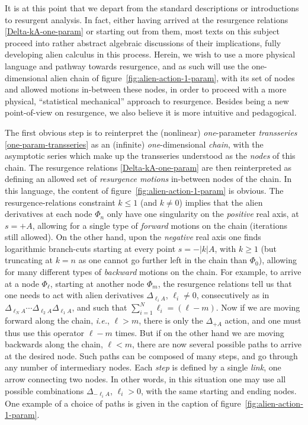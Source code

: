 \documentclass[11pt,a4paper]{article}
\begin{document}
It is at this point that we depart from the standard descriptions or introductions to resurgent analysis. In fact, either having arrived at the resurgence relations \eqref{Delta-kA-one-param} or starting out from them, most texts on this subject proceed into rather abstract algebraic discussions of their implications, fully developing alien calculus in this process. Herein, we wish to use a more physical language and pathway towards resurgence, and as such will use the one-dimensional alien chain of figure~\ref{fig:alien-action-1-param}, with its set of nodes and allowed motions in-between these nodes, in order to proceed with a more physical, ``statistical mechanical'' approach to resurgence. Besides being a new point-of-view on resurgence, we also believe it is more intuitive and pedagogical.

The first obvious step is to reinterpret the (nonlinear) \textit{one}-parameter \textit{transseries} \eqref{one-param-transseries} as an (infinite) \textit{one}-dimensional \textit{chain}, with the asymptotic series which make up the transseries understood as the \textit{nodes} of this chain. The resurgence relations \eqref{Delta-kA-one-param} are then reinterpreted as defining an allowed set of \textit{resurgence motions} in-between nodes of the chain. In this language, the content of figure~\ref{fig:alien-action-1-param} is obvious. The resurgence-relations constraint $k \le 1$ (and $k \neq 0$) implies that the alien derivatives at each node $\Phi_n$ only have one singularity on the \textit{positive} real axis, at $s=+A$, allowing for a single type of \textit{forward} motions on the chain (iterations still allowed). On the other hand, upon the \textit{negative} real axis one finds logarithmic branch-cuts starting at every point $s = - |k| A$, with $k\ge1$ (but truncating at $k=n$ as one cannot go further left in the chain than $\Phi_0$), allowing for many different types of \textit{backward} motions on the chain. For example, to arrive at a node $\Phi_{\ell}$, starting at another node $\Phi_{m}$, the resurgence relations tell us that one needs to act with alien derivatives $\Delta_{\ell_i A}$, $\ell_i \neq 0$, consecutively as in $\Delta_{\ell_N A} \cdots \Delta_{\ell_2 A}\Delta_{\ell_1 A}$, and such that $\sum_{i=1}^{N}\ell_i = (\ell-m)$. Now if we are moving forward along the chain, \textit{i.e.}, $\ell > m$, there is only the $\Delta_{+A}$ action, and one must thus use this operator $\ell-m$ times. But if on the other hand we are moving backwards along the chain, $\ell < m$, there are now several possible paths to arrive at the desired node. Such paths can be composed of many steps, and go through any number of intermediary nodes. Each \textit{step} is defined by a single \textit{link}, one arrow connecting two nodes. In other words, in this situation one may use all possible combinations $\Delta_{-\ell_i A}$, $\ell_i>0$, with the same starting and ending nodes. One example of a choice of paths is given in the caption of figure~\ref{fig:alien-action-1-param}.
\end{document}

